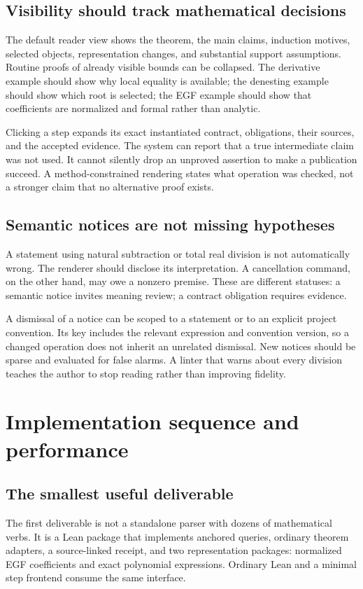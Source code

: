\documentclass[11pt,a4paper]{article}
\theoremstyle{definition}
\begin{document}
\subsection{Visibility should track mathematical decisions}
The default reader view shows the theorem, the main claims, induction motives,
selected objects, representation changes, and substantial support assumptions.
Routine proofs of already visible bounds can be collapsed. The derivative example
should show why local equality is available; the denesting example should show
which root is selected; the EGF example should show that coefficients are
normalized and formal rather than analytic.

Clicking a step expands its exact instantiated contract, obligations, their
sources, and the accepted evidence. The system can report that a true intermediate
claim was not used. It cannot silently drop an unproved assertion to make a
publication succeed. A method-constrained rendering states what operation was
checked, not a stronger claim that no alternative proof exists.

\subsection{Semantic notices are not missing hypotheses}
A statement using natural subtraction or total real division is not automatically
wrong. The renderer should disclose its interpretation. A cancellation command,
on the other hand, may owe a nonzero premise. These are different statuses:
a semantic notice invites meaning review; a contract obligation requires evidence.

A dismissal of a notice can be scoped to a statement or to an explicit project
convention. Its key includes the relevant expression and convention version,
so a changed operation does not inherit an unrelated dismissal. New notices
should be sparse and evaluated for false alarms. A linter that warns about every
division teaches the author to stop reading rather than improving fidelity.

\section{Implementation sequence and performance}\label{sec:implementation}
\subsection{The smallest useful deliverable}
The first deliverable is not a standalone parser with dozens of mathematical
verbs. It is a Lean package that implements anchored queries, ordinary theorem
adapters, a source-linked receipt, and two representation packages: normalized
EGF coefficients and exact polynomial expressions. Ordinary Lean and a minimal
step frontend consume the same interface.
\end{document}
